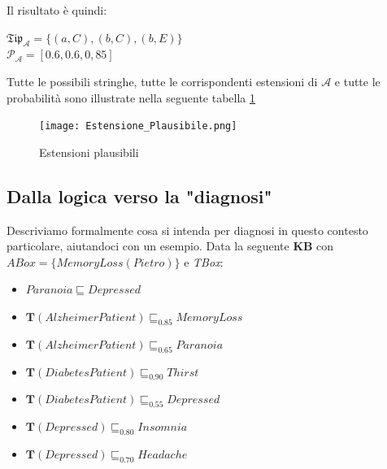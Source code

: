 Il risultato è quindi:
\begin{multicols}{2}
	$ \mathfrak{Tip}_{\mathcal{A}} = \{(a,C),(b,C),(b,E)\} $ \\
	$ \mathcal{P_{A}} = [0.6, 0.6, 0,85] $
\end{multicols}
Tutte le possibili stringhe, tutte le corrispondenti estensioni di $ \mathcal{A} $ e tutte le probabilità 
sono illustrate nella seguente tabella \ref{fig:estesioni}
\clearpage
\begin{figure}[t]
	\texttt{[image: Estensione\_Plausibile.png]}
	\caption{Estensioni plausibili}
	\label{fig:estesioni}
	\centering
\end{figure}

\subsection{Dalla logica verso la "diagnosi"}
Descriviamo formalmente cosa si intenda per diagnosi in questo contesto particolare, aiutandoci con un esempio.
Data la seguente \textbf{KB} con \\ $ \textit{ABox} = \{MemoryLoss(Pietro)\} $ e \textit{TBox}:
\begin{itemize}
	\item $ Paranoia \sqsubseteq Depressed $
	\item $ \mathbf{T}(AlzheimerPatient) \sqsubseteq_{0.85} MemoryLoss $
	\item $ \mathbf{T}(AlzheimerPatient) \sqsubseteq_{0.65} Paranoia $
	\item $ \mathbf{T}(DiabetesPatient) \sqsubseteq_{0.90} Thirst $
	\item $ \mathbf{T}(DiabetesPatient) \sqsubseteq_{0.55} Depressed $
	\item $ \mathbf{T}(Depressed) \sqsubseteq_{0.80} Insomnia $
	\item $ \mathbf{T}(Depressed) \sqsubseteq_{0.70} Headache $
\end{itemize}

